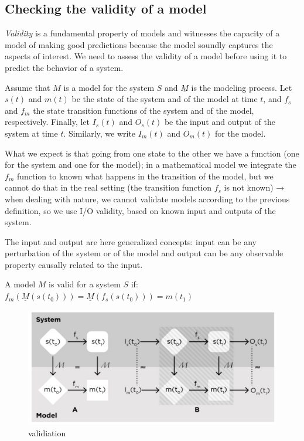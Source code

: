 \hypertarget{checking-the-validity-of-a-model}{%
\subsection{Checking the validity of a
model}\label{checking-the-validity-of-a-model}}

\emph{Validity} is a fundamental property of models and witnesses the
capacity of a model of making good predictions because the model soundly
captures the aspects of interest. We need to assess the validity of a
model before using it to predict the behavior of a system.

Assume that $M$ is a model for the system $S$ and $\underline{M}$ is the
modeling process. Let $s(t)$ and $m(t)$ be the state of the system and
of the model at time $t$, and $f_s$ and $f_m$ the state transition
functions of the system and of the model, respectively. Finally, let
$I_s(t)$ and $O_s(t)$ be the input and output of the system at time $t$.
Similarly, we write $I_m(t)$ and $O_m(t)$ for the model.

What we expect is that going from one state to the other we have a
function (one for the system and one for the model); in a mathematical
model we integrate the $f_m$ function to known what happens in the
transition of the model, but we cannot do that in the real setting (the
transition function $f_s$ is not known) → when dealing with nature, we
cannot validate models according to the previous definition, so we use
I/O validity, based on known input and outputs of the system.

The input and output are here generalized concepts: input can be any
perturbation of the system or of the model and output can be any
observable property causally related to the input.

A model $M$ is valid for a system $S$ if:
$f_m(\underline{M}(s(t_0))) = \underline{M}(f_s(s(t_0))) = m(t_1)$

\begin{figure}
\centering
\includegraphics{validation.png}
\caption{validiation}
\end{figure}

